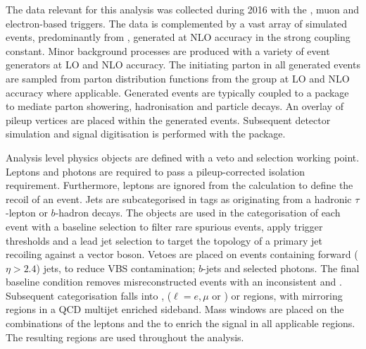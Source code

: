The data relevant for this analysis was collected during 2016 with the \ptmiss, muon and electron-based triggers. The data is complemented by a vast array of simulated events, predominantly from \IVj, generated at NLO accuracy in the strong coupling constant. Minor background processes are produced with a variety of event generators at LO and NLO accuracy. The initiating parton in all generated events are sampled from parton distribution functions from the \NNPDF group at LO and NLO accuracy where applicable. Generated events are typically coupled to a package to mediate parton showering, hadronisation and particle decays. An overlay of pileup vertices are placed within the generated events. Subsequent detector simulation and signal digitisation is performed with the \GEANT package.

Analysis level physics objects are defined with a veto and selection working point. Leptons and photons are required to pass a pileup-corrected isolation requirement. Furthermore, leptons are ignored from the \ptmiss calculation to define the recoil of an event. Jets are subcategorised in tags as originating from a hadronic $\tau$-lepton or $b$-hadron decays. The objects are used in the categorisation of each event with a baseline selection to filter rare spurious \ptmiss events, apply trigger thresholds and a lead jet selection to target the topology of a primary jet recoiling against a vector boson. Vetoes are placed on events containing forward (${\eta>2.4}$) jets, to reduce VBS contamination; $b$-jets and selected photons. The final baseline condition removes misreconstructed events with an inconsistent \ptmiss and \ptmisscalo. Subsequent categorisation falls into \metplusjets, \ellplusjets ($\ell=e,\mu$ or \Ptauh) or \diellplusjets regions, with mirroring regions in a QCD multijet enriched sideband. Mass windows are placed on the combinations of the leptons and the \ptmiss to enrich the signal in all applicable regions. The resulting regions are used throughout the analysis.

